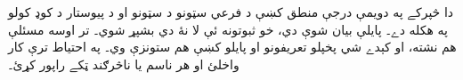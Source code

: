 \documentclass[../../../include/open-logic-chapter]{subfiles}
\begin{document}

\begin{editorial}
دا څپرکے په دويمې درجې منطق کښې د فرعي سټونو د سټونو او د پيوستار د
کوډ کولو په هکله دے۔ پايلې بيان شوې دي، خو ثبوتونه ئې لا نۀ دي
بشپړ شوي۔ تر اوسه مسئلې هم نشته، او کېدے شي پخپلو تعريفونو او
پايلو کښې هم ستونزې وي۔ په احتياط ترې کار واخلئ او هر ناسم يا
ناڅرګند ټکے راپور کړئ۔
\end{editorial}





\OLEndChapterHook
\end{document}
